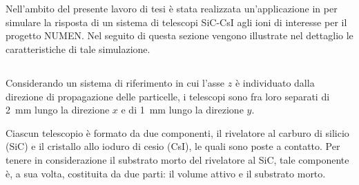 \section{}

Nell'ambito del presente lavoro di tesi è stata realizzata un'applicazione in \geant{} per simulare la risposta di un sistema di telescopi SiC-CsI agli ioni di interesse per il progetto NUMEN.
Nel seguito di questa sezione vengono illustrate nel dettaglio le caratteristiche di tale simulazione.




\subsection{} \label{par:geometria}

Considerando un sistema di riferimento in cui l'asse $z$ è individuato dalla direzione di propagazione delle particelle, i telescopi sono fra loro separati di 2~mm lungo la direzione $x$ e di 1~mm lungo la direzione $y$.

Ciascun telescopio è formato da due componenti, il rivelatore al carburo di silicio (SiC) e il cristallo allo ioduro di cesio (CsI), le quali sono poste a contatto.
Per tenere in considerazione il substrato morto del rivelatore al SiC, tale componente è, a sua volta, costituita da due parti: il volume attivo e il substrato morto.
%




